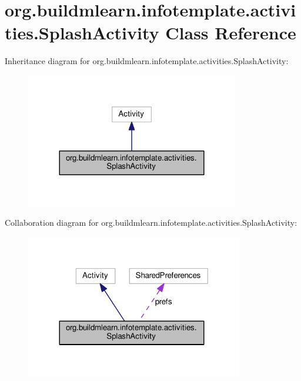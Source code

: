 \hypertarget{classorg_1_1buildmlearn_1_1infotemplate_1_1activities_1_1SplashActivity}{}\section{org.\+buildmlearn.\+infotemplate.\+activities.\+Splash\+Activity Class Reference}
\label{classorg_1_1buildmlearn_1_1infotemplate_1_1activities_1_1SplashActivity}


Inheritance diagram for org.\+buildmlearn.\+infotemplate.\+activities.\+Splash\+Activity\+:
\nopagebreak
\begin{figure}[H]
\begin{center}
\leavevmode
\includegraphics[width=264pt]{classorg_1_1buildmlearn_1_1infotemplate_1_1activities_1_1SplashActivity__inherit__graph}
\end{center}
\end{figure}


Collaboration diagram for org.\+buildmlearn.\+infotemplate.\+activities.\+Splash\+Activity\+:
\nopagebreak
\begin{figure}[H]
\begin{center}
\leavevmode
\includegraphics[width=269pt]{classorg_1_1buildmlearn_1_1infotemplate_1_1activities_1_1SplashActivity__coll__graph}
\end{center}
\end{figure}

